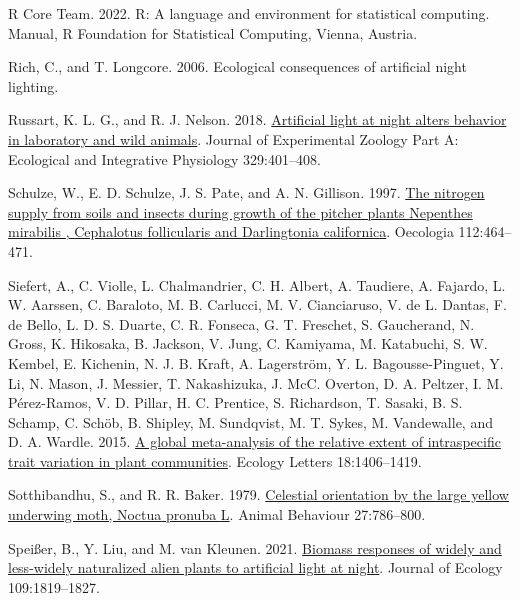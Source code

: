 \documentclass[
  12pt,
  letterpaper,
  DIV=11,
  numbers=noendperiod]{scrartcl}
\newlength{\cslhangindent}
\newlength{\cslentryspacingunit} %
\newenvironment{CSLReferences}[2] %
 {%
  \setlength{\parindent}{0pt}
  \ifodd #1
  \let\oldpar\par
  \def\par{\hangindent=\cslhangindent\oldpar}
  \fi
  \setlength{\parskip}{#2\cslentryspacingunit}
 }%
 {}
\begin{document}
\begin{CSLReferences}{1}{0}
\leavevmode{}%
R Core Team. 2022. R: {A} language and environment for statistical
computing. Manual, {R Foundation for Statistical Computing}, {Vienna,
Austria}.

\leavevmode{}%
Rich, C., and T. Longcore. 2006. Ecological consequences of artificial
night lighting.

\leavevmode{}%
Russart, K. L. G., and R. J. Nelson. 2018.
\href{https://doi.org/10.1002/jez.2173}{Artificial light at night alters
behavior in laboratory and wild animals}. Journal of Experimental
Zoology Part A: Ecological and Integrative Physiology 329:401--408.

\leavevmode{}%
Schulze, W., E. D. Schulze, J. S. Pate, and A. N. Gillison. 1997.
\href{https://doi.org/10.1007/s004420050333}{The nitrogen supply from
soils and insects during growth of the pitcher plants {Nepenthes}
mirabilis , {Cephalotus} follicularis and {Darlingtonia} californica}.
Oecologia 112:464--471.

\leavevmode{}%
Siefert, A., C. Violle, L. Chalmandrier, C. H. Albert, A. Taudiere, A.
Fajardo, L. W. Aarssen, C. Baraloto, M. B. Carlucci, M. V. Cianciaruso,
V. de L. Dantas, F. de Bello, L. D. S. Duarte, C. R. Fonseca, G. T.
Freschet, S. Gaucherand, N. Gross, K. Hikosaka, B. Jackson, V. Jung, C.
Kamiyama, M. Katabuchi, S. W. Kembel, E. Kichenin, N. J. B. Kraft, A.
Lagerström, Y. L. Bagousse-Pinguet, Y. Li, N. Mason, J. Messier, T.
Nakashizuka, J. McC. Overton, D. A. Peltzer, I. M. Pérez-Ramos, V. D.
Pillar, H. C. Prentice, S. Richardson, T. Sasaki, B. S. Schamp, C.
Schöb, B. Shipley, M. Sundqvist, M. T. Sykes, M. Vandewalle, and D. A.
Wardle. 2015. \href{https://doi.org/10.1111/ele.12508}{A global
meta-analysis of the relative extent of intraspecific trait variation in
plant communities}. Ecology Letters 18:1406--1419.

\leavevmode{}%
Sotthibandhu, S., and R. R. Baker. 1979.
\href{https://doi.org/10.1016/0003-3472(79)90015-0}{Celestial
orientation by the large yellow underwing moth, {Noctua} pronuba {L}}.
Animal Behaviour 27:786--800.

\leavevmode{}%
Speißer, B., Y. Liu, and M. van Kleunen. 2021.
\href{https://doi.org/10.1111/1365-2745.13607}{Biomass responses of
widely and less-widely naturalized alien plants to artificial light at
night}. Journal of Ecology 109:1819--1827.


\end{CSLReferences}
\end{document}
